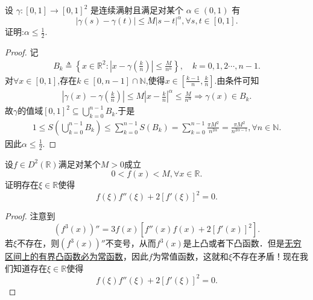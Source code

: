 \documentclass[../../main.tex]{subfiles}%
\begin{document}
\begin{example}
设 $\gamma:[0,1]\to[0,1]^2$ 是连续满射且满足对某个 $\alpha\in(0,1)$ 有
\[
|\gamma(s)-\gamma(t)|\leqslant M|s-t|^\alpha,\forall s,t\in[0,1].
\]
证明:$\alpha\leqslant\frac{1}{2}$.
\end{example}
\begin{proof}

记
\begin{align*}
B_k\triangleq \left\{ x\in \mathbb{R} ^2:\left| x-\gamma \left( \frac{k}{n} \right) \right|\leqslant \frac{M}{n^{\alpha}} \right\},\quad k=0,1,2\cdots,n-1.
\end{align*}
对$\forall x\in \left[ 0,1 \right]$,存在$k\in \left[ 0,n-1 \right] \cap \mathbb{N}$,使得$x\in \left[ \frac{k-1}{n},\frac{k}{n} \right]$.由条件可知
\begin{align*}
\left| \gamma \left( x \right) -\gamma \left( \frac{k}{n} \right) \right|\leqslant M\left| x-\frac{k}{n} \right|^{\alpha}\leqslant \frac{M}{n^{\alpha}}\Longrightarrow \gamma \left( x \right) \in B_k.
\end{align*}
故$\gamma$的值域$\left[ 0,1 \right] ^2\subseteq \bigcup_{k=0}^{n-1}{B_k}$.于是
\begin{align*}
1\leqslant S\left( \bigcup_{k=0}^{n-1}{B_k} \right) \leqslant \sum\limits_{k=0}^{n-1}{S\left( B_k \right)}=\sum\limits_{k=0}^{n-1}{\frac{\pi M^2}{n^{2\alpha}}}=\frac{\pi M^2}{n^{2\alpha -1}},\forall n\in \mathbb{N}.
\end{align*}
因此$\alpha \leqslant \frac{1}{2}$.

\end{proof}

\begin{example}
设$f \in D^2(\mathbb{R})$满足对某个$M > 0$成立
$$0 < f(x) < M, \forall x \in \mathbb{R}.$$
证明存在$\xi \in \mathbb{R}$使得
$$f(\xi)f''(\xi) + 2[f'(\xi)]^2 = 0.$$
\end{example}
\begin{proof}

注意到
$$(f^3(x))'' = 3f(x)\left[f''(x)f(x) + 2[f'(x)]^2\right].$$
若$\xi$不存在，则$(f^3(x))''$不变号，从而$f^3(x)$是上凸或者下凸函数．但是\hyperref[proposition:无穷区间上的有界凸函数必为常函数]{无穷区间上的有界凸函数必为常函数}，因此$f$为常值函数，这就和$\xi$不存在矛盾！现在我们知道存在$\xi \in \mathbb{R}$使得
$$f(\xi)f''(\xi) + 2[f'(\xi)]^2 = 0.$$

\end{proof}
\end{document}
